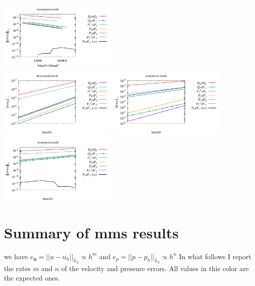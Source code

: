 \begin{center}
\includegraphics[width=5.7cm]{python_codes/fieldstone_120/paperresults/plin_structured_errors_divv2.pdf}\\
\includegraphics[width=5.7cm]{python_codes/fieldstone_120/paperresults/plin_structured_errorsV3.pdf}
\includegraphics[width=5.7cm]{python_codes/fieldstone_120/paperresults/plin_structured_errorsP3.pdf}
\includegraphics[width=5.7cm]{python_codes/fieldstone_120/paperresults/plin_structured_errors_divv3.pdf}
\end{center}






\newpage
\section*{Summary of mms results}


we have $e_{\bm u}=||u-u_h||_{L_2} \propto h^m$ and $e_p=||p-p_h||_{L_2} \propto h^n$
In what follows I report the rates $m$ and $n$ of the velocity and pressure errors.
All values in {\color{teal} this color} are the expected ones.

